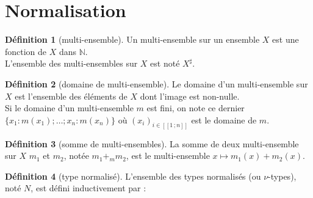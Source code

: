 \documentclass [a4paper,12pt] {article}
\theoremstyle {definition}
\newtheorem {definition} {Définition} [section]
\newcommand {\interval} [2] {[\![#1\,;#2]\!]}
\newcommand {\V} {\mathscr V}
\begin{document}

\section {Normalisation}

\begin {definition} [multi-ensemble]
	Un multi-ensemble sur un ensemble $X$ est une fonction de $X$ dans $\mathbb N$. \\
	L'ensemble des multi-ensembles sur $X$ est noté $X^\sharp$.
\end {definition}

\begin {definition} [domaine de multi-ensemble]
	Le domaine d'un multi-ensemble sur $X$ est l'ensemble des éléments de $X$ dont l'image est non-nulle. \\
	Si le domaine d'un multi-ensemble $m$ est fini, on note ce dernier $\{ x_1 : m (x_1) ; \dots ; x_n : m (x_n) \}$ où $(x_i)_{i \in \interval 1 n}$ est le domaine de $m$.
\end {definition}

\begin {definition} [somme de multi-ensembles]
	La somme de deux multi-ensemble sur $X$ $m_1$ et $m_2$, notée $m_1 +_m m_2$, est le multi-ensemble $x \mapsto m_1 (x) + m_2 (x)$.
\end {definition}

\begin {definition} [type normalisé]
	L'ensemble des types normalisés (ou $\nu$-types), noté $N$, est défini inductivement par :
	\begin {center}
	\end {center}
\end {definition}

\end{document}
